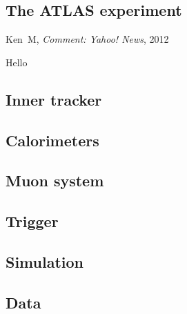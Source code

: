 \begin{singlespacing}
\chapter{The ATLAS experiment}
\label{chapter:experiment}
%
\begin{epigraphs}
%
{Ken~M,
\textit{Comment: Yahoo! News},
2012~\cite{kenm2012inner}}
\end{epigraphs}
\end{singlespacing}

Hello


\section{Inner tracker}
\label{sec:atlas_tracker}

\section{Calorimeters}
\label{sec:atlas_calo}


\section{Muon system}
\label{sec:atlas_muon}

\section{Trigger}
\label{sec:atlas_trigger}

\section{Simulation}
\label{sec:atlas_simulation}

\section{Data}
\label{sec:atlas_data}

